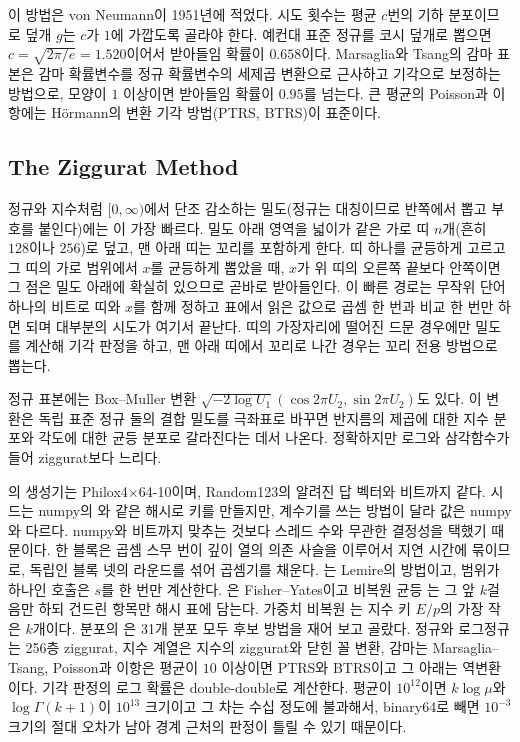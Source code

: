 이 방법은 von Neumann이 1951년에 적었다\cite{vonneumann1951}. 시도 횟수는 평균 $c$번의 기하 분포이므로 덮개 $g$는 $c$가 $1$에 가깝도록 골라야 한다. 예컨대 표준 정규를 코시 덮개로 뽑으면 $c=\sqrt{2\pi/e}=1.520$이어서 받아들임 확률이 $0.658$이다. Marsaglia와 Tsang의 감마 표본은 감마 확률변수를 정규 확률변수의 세제곱 변환으로 근사하고 기각으로 보정하는 방법으로, 모양이 $1$ 이상이면 받아들임 확률이 $0.95$를 넘는다\cite{marsaglia2000gamma}. 큰 평균의 Poisson과 이항에는 Hörmann의 변환 기각 방법(PTRS, BTRS)이 표준이다\cite{hormann1993poisson,hormann1993binomial}.

\subsection{The Ziggurat Method}

정규와 지수처럼 $[0,\infty)$에서 단조 감소하는 밀도(정규는 대칭이므로 반쪽에서 뽑고 부호를 붙인다)에는 이 가장 빠르다\cite{marsaglia2000ziggurat}. 밀도 아래 영역을 넓이가 같은 가로 띠 $n$개(흔히 $128$이나 $256$)로 덮고, 맨 아래 띠는 꼬리를 포함하게 한다. 띠 하나를 균등하게 고르고 그 띠의 가로 범위에서 $x$를 균등하게 뽑았을 때, $x$가 위 띠의 오른쪽 끝보다 안쪽이면 그 점은 밀도 아래에 확실히 있으므로 곧바로 받아들인다. 이 빠른 경로는 무작위 단어 하나의 비트로 띠와 $x$를 함께 정하고 표에서 읽은 값으로 곱셈 한 번과 비교 한 번만 하면 되며 대부분의 시도가 여기서 끝난다. 띠의 가장자리에 떨어진 드문 경우에만 밀도를 계산해 기각 판정을 하고, 맨 아래 띠에서 꼬리로 나간 경우는 꼬리 전용 방법으로 뽑는다.

정규 표본에는 Box--Muller 변환 $\sqrt{-2\log U_1}(\cos2\pi U_2,\sin2\pi U_2)$도 있다\cite{box1958}. 이 변환은 독립 표준 정규 둘의 결합 밀도를 극좌표로 바꾸면 반지름의 제곱에 대한 지수 분포와 각도에 대한 균등 분포로 갈라진다는 데서 나온다. 정확하지만 로그와 삼각함수가 들어 ziggurat보다 느리다.

\begin{instardust}
의 생성기는 Philox4×64-10이며, Random123의 알려진 답 벡터와 비트까지 같다. 시드는 numpy의 와 같은 해시로 키를 만들지만, 계수기를 쓰는 방법이 달라 값은 numpy와 다르다. numpy와 비트까지 맞추는 것보다 스레드 수와 무관한 결정성을 택했기 때문이다. 한 블록은 곱셈 스무 번이 깊이 열의 의존 사슬을 이루어서 지연 시간에 묶이므로, 독립인 블록 넷의 라운드를 섞어 곱셈기를 채운다. 는 Lemire의 방법이고, 범위가 하나인 호출은 $s$를 한 번만 계산한다. 은 Fisher--Yates이고 비복원 균등 는 그 앞 $k$걸음만 하되 건드린 항목만 해시 표에 담는다. 가중치 비복원 는 지수 키 $E/p$의 가장 작은 $k$개이다. 분포의 은 31개 분포 모두 후보 방법을 재어 보고 골랐다. 정규와 로그정규는 256층 ziggurat, 지수 계열은 지수의 ziggurat와 닫힌 꼴 변환, 감마는 Marsaglia--Tsang, Poisson과 이항은 평균이 $10$ 이상이면 PTRS와 BTRS이고 그 아래는 역변환이다. 기각 판정의 로그 확률은 double-double로 계산한다. 평균이 $10^{12}$이면 $k\log\mu$와 $\log\Gamma(k+1)$이 $10^{13}$ 크기이고 그 차는 수십 정도에 불과해서, binary64로 빼면 $10^{-3}$ 크기의 절대 오차가 남아 경계 근처의 판정이 틀릴 수 있기 때문이다.
\end{instardust}

